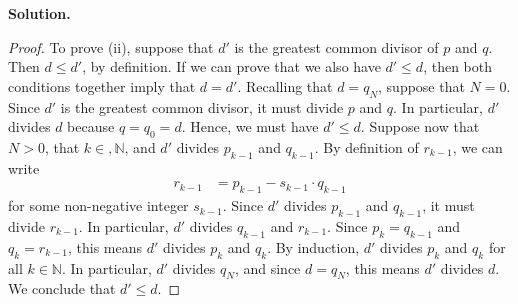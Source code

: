 \documentclass[12pt, a4paper]{article}
\newenvironment{sol}[1][Solution]
{\par\medskip\noindent \textbf{#1.} }
{\medskip}
\begin{document}
\begin{sol}
\begin{proof}
			To prove (ii), suppose that $d'$ is the greatest common divisor of $p$ and $q$.
			Then $d \leq d'$, by definition. If we can prove that we also have $d' \leq d$,
			then both conditions together imply that $d = d'$. Recalling that $d = q_N$,
			suppose that $N = 0$. Since $d'$ is the greatest common divisor, it must divide
			$p$ and $q$. In particular, $d'$ divides $d$ because $q=q_0=d$. Hence, we must
			have $d'\leq d$. Suppose now that $N>0$, that $k\in, \mathbb{N}$, and $d'$ divides
			$p_{k-1}$ and $q_{k-1}$. By  definition of $r_{k-1}$, we can write
			\begin{align*}
				r_{k-1} &= p_{k-1} - s_{k-1}\cdot q_{k-1}
			\end{align*}
			for some non-negative integer $s_{k-1}$. Since $d'$ divides $p_{k-1}$ and $q_{k-1}$,
			it must divide $r_{k-1}$. In particular, $d'$ divides $q_{k-1}$ and
			$r_{k-1}$. Since $p_k = q_{k-1}$ and $q_k = r_{k-1}$, this means $d'$ divides
			$p_k$ and $q_k$. By induction, $d'$  divides $p_k$ and $q_k$ for all $k\in\mathbb{N}$.
			In particular, $d'$ divides $q_N$, and since $d = q_N$, this means $d'$ divides $d$.
			We conclude that $d' \leq d$.
		\end{proof}
	\end{sol}
	\pagebreak
	\printbibliography
\end{document}
